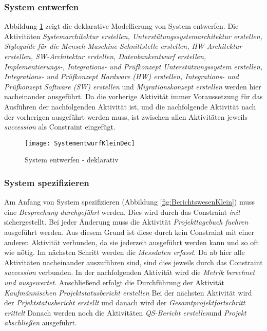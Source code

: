 \subsubsection{System entwerfen}


Abbildung \ref{fig:SystementwurfKleinDec} zeigt die deklarative Modellierung von System entwerfen.\newline
Die Aktivitäten \textit{Systemarchitektur erstellen, Unterstütungssystemarchitektur erstellen, Styleguide für die Mensch-Maschine-Schnittstelle erstellen, HW-Architektur erstellen, SW-Architektur erstellen, Datenbankentwurf erstellen, Implementierungs-, Integrations- und Prüfkonzept Unterstützungssystem erstellen, Integrations- und Prüfkonzept Hardware (HW) erstellen, Integrations- und Prüfkonzept Software (SW) erstellen} und \textit{Migrationskonzept erstellen} werden hier nacheinander ausgeführt. Da die vorherige Aktivität immer Voraussetzung für das Ausführen der nachfolgenden Aktivität ist, und die nachfolgende Aktivität nach der vorherigen ausgeführt werden muss, ist zwischen allen Aktivitäten jeweils \textit{succession} als Constraint eingefügt.

\begin{figure}[!htbp]
\begin{center}
  \texttt{[image: SystementwurfKleinDec]} %
  \caption{System entwerfen - deklarativ}
  \label{fig:SystementwurfKleinDec}
\end{center}
\end{figure}

\subsubsection{System spezifizieren}


Am Anfang von System spezifizieren (Abbildung \ref{fig:BerichtswesenKlein}) muss eine \textit{Besprechung durchgeführt} werden. Dies wird durch das Constraint \textit{init} sichergestellt.\newline
Bei jeder Änderung muss die Aktivität \textit{Projekttagebuch fuehren} ausgeführt werden. Aus diesem Grund ist diese durch kein Constraint mit einer anderen Aktivität verbunden, da sie jederzeit ausgeführt werden kann und so oft wie nötig.\newline
Im nächsten Schritt werden die \textit{Messdaten erfasst}. Da ab hier alle Aktivitäten nacheinander auszuführen sind, sind dies jeweils durch das Constraint \textit{succession} verbunden.\newline
In der nachfolgenden Aktivität wird die \textit{Metrik berechnet und ausgewertet}.\newline
Anschließend erfolgt die Durchführung der Aktivität \textit{Kaufmännischen Projektstatusbericht erstellen}\newline
Bei der nächsten Aktivität wird der \textit{Prjektstatusbericht erstellt} und danach wird der \textit{Gesamtprojektfortschritt erittelt}\newline
Danach werden noch die Aktivitäten \textit{QS-Bericht erstellen}und \textit{Projekt abschließen} ausgeführt.

